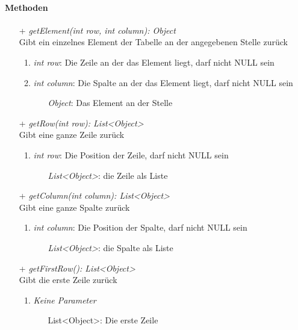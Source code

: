 \paragraph{Methoden}
\begin{itemize}
	\item[+] \textit{getElement(int row, int column): Object} \\
	Gibt ein einzelnes Element der Tabelle an der angegebenen Stelle zurück
	\begin{enumerate}
		\item \textit{int row}: Die Zeile an der das Element liegt, darf nicht NULL sein
		\item \textit{int column}: Die Spalte an der das Element liegt, darf nicht NULL sein
		\begin{itemize}
			\item[] \textit{Object}: Das Element an der Stelle
		\end{itemize}
	\end{enumerate}

	\item[+] \textit{getRow(int row): List<Object>} \\
	Gibt eine ganze Zeile zurück
	\begin{enumerate}
		\item \textit{int row}: Die Position der Zeile, darf nicht NULL sein
		\begin{itemize}
			\item[] \textit{List<Object>}: die Zeile als Liste
		\end{itemize}
	\end{enumerate}

	\item[+] \textit{getColumn(int column): List<Object>} \\
	Gibt eine ganze Spalte zurück
	\begin{enumerate}
	\item \textit{int column}: Die Position der Spalte, darf nicht NULL sein
		\begin{itemize}
			\item[] \textit{List<Object>}: die Spalte als Liste
		\end{itemize}
	\end{enumerate}	
		
	\item[+] \textit{getFirstRow(): List<Object>} \\
	Gibt die erste Zeile zurück
	\begin{enumerate}
		\item \textit{Keine Parameter}
		\begin{itemize}
			\item[] List<Object>: Die erste Zeile
		\end{itemize}
	\end{enumerate}	


\end{itemize}
